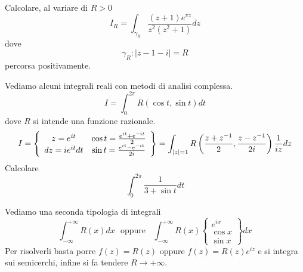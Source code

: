 Calcolare, al variare di $R >0$
\begin{equation*}
I_{R} =\int _{\gamma _{R}}\frac{\left( z+1\right) e^{\pi z}}{z^{2}\left( z^{2} +1\right)} dz
\end{equation*}
dove
\begin{equation*}
\gamma _{R} :\left| z-1-i\right| =R
\end{equation*}
percorsa positivamente.
\Esercizio{}

Vediamo alcuni integrali reali con metodi di analisi complessa.
\begin{equation*}
I=\boxed{\int ^{2\pi }_{0} R\left(\cos t,\sin t\right) dt}
\end{equation*}
dove $R$ si intende una funzione razionale.
\begin{equation*}
I=\left\{\begin{array}{ c c }
z=e^{it} & \cos t=\frac{e^{it} +e^{-it}}{2}\\
dz=ie^{it} dt & \sin t=\frac{e^{it} -e^{-it}}{2i}
\end{array}\right\} =\int _{\left| z\right| =1} R\left(\frac{z+z^{-1}}{2} ,\frac{z-z^{-1}}{2i}\right)\frac{1}{iz} dz
\end{equation*}
Calcolare
\begin{equation*}
\int ^{2\pi }_{0}\frac{1}{3+\sin t} dt
\end{equation*}
\Esercizio{}

Vediamo una seconda tipologia di integrali
\begin{equation*}
\boxed{\int ^{+\infty }_{-\infty } R\left( x\right) dx} \ \ \ \text{oppure} \ \ \ \ \boxed{\int ^{+\infty }_{-\infty } R\left( x\right)\left\{\begin{array}{ c }
e^{ix}\\
\cos x\\
\sin x
\end{array}\right\} dx}
\end{equation*}
Per risolverli basta porre $f\left( z\right) =R\left( z\right)$ oppure $f\left( z\right) =R\left( z\right) e^{iz}$ e si integra sui semicerchi, infine si fa tendere $R\rightarrow +\infty $.

